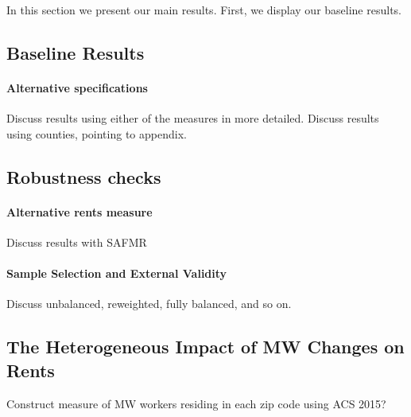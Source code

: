 
In this section we present our main results. First, we display our baseline results.   

\subsection{Baseline Results}\label{sec:baseline_results}


\paragraph{Alternative specifications} 

Discuss results using either of the measures in more detailed.
Discuss results using counties, pointing to appendix.

\subsection{Robustness checks}\label{sec:sample_rest}

\paragraph{Alternative rents measure} 

Discuss results with SAFMR

\paragraph{Sample Selection and External Validity} 

Discuss unbalanced, reweighted, fully balanced, and so on.


\subsection{The Heterogeneous Impact of MW Changes on Rents}\label{sec:heter}

Construct measure of MW workers residing in each zip code using ACS 2015?
